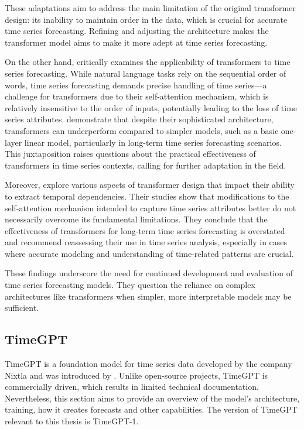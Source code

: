 \documentclass[12pt,a4paper]{article}
\begin{document}
These adaptations aim to address the main limitation of the original transformer design: its inability to maintain order in the data, which is crucial for accurate time series forecasting. Refining and adjusting the architecture makes the transformer model aims to make it more adept at time series forecasting. 

On the other hand, \cite{zeng2022transformers} critically examines the applicability of transformers to time series forecasting. While natural language tasks rely on the sequential order of words, time series forecasting demands precise handling of time series—a challenge for transformers due to their self-attention mechanism, which is relatively insensitive to the order of inputs, potentially leading to the loss of time series attributes. \cite{zeng2022transformers} demonstrate that despite their sophisticated architecture, transformers can underperform compared to simpler models, such as a basic one-layer linear model, particularly in long-term time series forecasting scenarios. This juxtaposition raises questions about the practical effectiveness of transformers in time series contexts, calling for further adaptation in the field.

Moreover, \cite{zeng2022transformers} explore various aspects of transformer design that impact their ability to extract temporal dependencies. Their studies show that modifications to the self-attention mechanism intended to capture time series attributes better do not necessarily overcome its fundamental limitations. They conclude that the effectiveness of transformers for long-term time series forecasting is overstated and recommend reassessing their use in time series analysis, especially in cases where accurate modeling and understanding of time-related patterns are crucial.

These findings underscore the need for continued development and evaluation of time series forecasting models. They question the reliance on complex architectures like transformers when simpler, more interpretable models may be sufficient.

\subsection{TimeGPT}

TimeGPT is a foundation model for time series data developed by the company Nixtla and was introduced by \cite{garza2023timegpt1}. Unlike open-source projects, TimeGPT is commercially driven, which results in limited technical documentation. Nevertheless, this section aims to provide an overview of the model's architecture, training, how it creates forecasts and other capabilities. The version of TimeGPT relevant to this thesis is TimeGPT-1.
\end{document}
